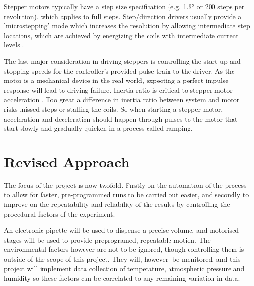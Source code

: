 Stepper motors typically have a step size specification (e.g. 1.8° or 200 steps per revolution), which applies to full steps. Step/direction drivers usually provide a 'microstepping' mode which increases the resolution by allowing intermediate step locations, which are achieved by energizing the coils with intermediate current levels \cite{step_book}.

The last major consideration in driving steppers is controlling the start-up and stopping speeds for the controller's provided pulse train to the driver. As the motor is a mechanical device in the real world, expecting a perfect impulse response will lead to driving failure. Inertia ratio is critical to stepper motor acceleration \cite{step_book}. Too great a difference in inertia ratio between system and motor risks missed steps or stalling the coils. So when starting a stepper motor, acceleration and deceleration should happen through pulses to the motor that start slowly and gradually quicken in a process called ramping.

\section{Revised Approach}
The focus of the project is now twofold. Firstly on the automation of the process to allow for faster, pre-programmed runs to be carried out easier, and secondly to improve on the repeatability and reliability of the results by controlling the procedural factors of the experiment. 

An electronic pipette will be used to dispense a precise volume, and motorised stages will be used to provide preprogramed, repeatable motion. The environmental factors however are not to be ignored, though controlling them is outside of the scope of this project. They will, however, be monitored, and this project will implement data collection of temperature, atmospheric pressure and humidity so these factors can be correlated to any remaining variation in data.  